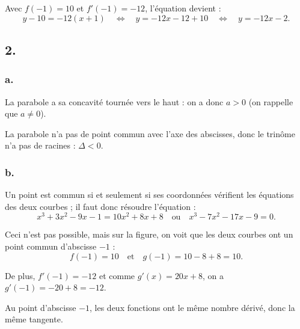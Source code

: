 \documentclass[10pt]{article}
\begin{document}
	Avec \(f(-1) = 10\) et \(f'(-1) = -12\), l'équation devient :
	\[
	y - 10 = -12(x + 1) \quad \Leftrightarrow \quad y = -12x - 12 + 10 \quad \Leftrightarrow \quad y = -12x - 2.
	\]
	
	\subsection*{2.}
	
	\subsubsection*{a.}
	
	La parabole a sa concavité tournée vers le haut : on a donc \(a > 0\) (on rappelle que \(a \neq 0\)).
	
	La parabole n'a pas de point commun avec l'axe des abscisses, donc le trinôme n'a pas de racines : \(\Delta < 0\).
	
	\subsubsection*{b.}
	
	Un point est commun si et seulement si ses coordonnées vérifient les équations des deux courbes ; il faut donc résoudre l'équation :
	\[
	x^3 + 3x^2 - 9x - 1 = 10x^2 + 8x + 8 \quad \text{ou} \quad x^3 - 7x^2 - 17x - 9 = 0.
	\]
	
	Ceci n'est pas possible, mais sur la figure, on voit que les deux courbes ont un point commun d'abscisse \(-1\) :
	\[
	f(-1) = 10 \quad \text{et} \quad g(-1) = 10 - 8 + 8 = 10.
	\]
	
	De plus, \(f'(-1) = -12\) et comme \(g'(x) = 20x + 8\), on a \(g'(-1) = -20 + 8 = -12\).
	
	Au point d'abscisse \(-1\), les deux fonctions ont le même nombre dérivé, donc la même tangente.
\end{document}
